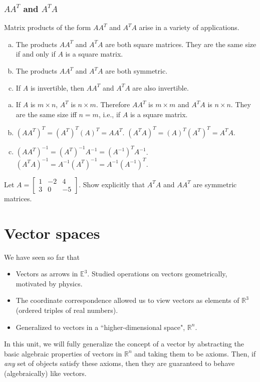 \documentclass[12pt,letterpaper,reqno]{article}
\numberwithin{equation}{section}
\newcommand{\fixme}[1]{{\color{orange}{[#1]}}}
\begin{document}
\subsubsection{$AA^T$ and $A^TA$}
Matrix products of the form $AA^T$ and $A^TA$ arise in a variety of applications. 

\begin{thm}\label{thm:props_of_aat_and_ata}
	\begin{enumerate}[(a)]
		\item The products $AA^T$ and $A^TA$ are both square matrices. They are the same size if and only if $A$ is a square matrix.
		\item The products $AA^T$ and $A^TA$ are both symmetric.
		\item If $A$ is invertible, then $AA^T$ and $A^TA$ are also invertible.
	\end{enumerate}
\end{thm}

\begin{pf}
	\begin{enumerate}[(a)]
		\item If $A$ is $m\times n$, $A^T$ is $n \times m$. Therefore $AA^T$ is $m \times m$ and $A^TA$ is $n \times n$. They are the same size iff $n=m$, i.e., if $A$ is a square matrix.
		\item $(AA^T)^T=(A^T)^T(A)^T=AA^T$. $(A^TA)^T=(A)^T(A^T)^T=A^TA$.
		\item $(AA^T)^{-1}=(A^T)^{-1}A^{-1}=(A^{-1})^TA^{-1}$. $(A^TA)^{-1}=A^{-1}(A^T)^{-1}=A^{-1}(A^{-1})^T$.
	\end{enumerate}
\end{pf}

\begin{exercise}
	Let $A=\begin{bmatrix}
		1 & -2 & 4 \\ 3 & 0 & -5
	\end{bmatrix}$. Show explicitly that $A^TA$ and $AA^T$ are symmetric matrices.	
\end{exercise}

\section{Vector spaces}
We have seen so far that
\begin{itemize}
	\item Vectors as arrows in $\mathbb{E}^3$. Studied operations on vectors geometrically, motivated by physics.
	\item The coordinate correspondence allowed us to view vectors as elements of $\mathbb{R}^3$ (ordered triples of real numbers).
	\item Generalized to  vectors in a ``higher-dimensional space", $\mathbb{R}^n$.
\end{itemize}
In this unit, we will fully generalize the concept of a vector by abstracting the basic algebraic properties of vectors in $\mathbb{R}^n$ and taking them to be axioms. Then, if \emph{any} set of objects satisfy these axioms, then they are guaranteed to behave (algebraically) like vectors. \fixme{Needs better introduction.}
\end{document}
